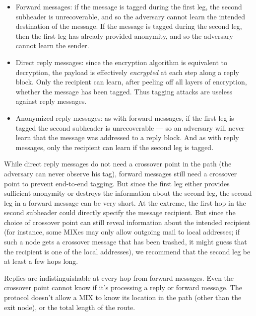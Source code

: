 \documentclass{llncs}
\begin{document}
\begin{itemize}
\item Forward messages: if the message is tagged during the first leg,
the second subheader is unrecoverable, and so the adversary cannot
learn the intended destination of the message. If the message is tagged
during the second leg, then the first leg has already provided anonymity,
and so the adversary cannot learn the sender.
\item Direct reply messages: since the encryption algorithm is equivalent to
decryption, the payload is effectively \emph{encrypted} at each step
along a reply block. Only the recipient can learn, after peeling off
all layers of encryption, whether the message has been tagged. Thus
tagging attacks are useless against reply messages.
\item Anonymized reply messages: as with forward messages, if the first leg
is tagged the second subheader is unrecoverable --- so an adversary will
never learn that the message was addressed to a reply block. And as with
reply messages, only the recipient can learn if the second leg is tagged.
\end{itemize}

While direct reply messages do not need a crossover point in the path
(the adversary can never observe his tag), forward messages still need a
crossover point to prevent end-to-end tagging. But since the first leg
either provides sufficient anonymity or destroys the information about
the second leg, the second leg in a forward message can be very short.
At the extreme, the first hop in the second subheader could directly
specify the message recipient. But since the choice of crossover point
can still reveal information about the intended recipient (for instance,
some MIXes may only allow outgoing mail to local addresses; if such a
node gets a crossover message that has been trashed, it might guess
that the recipient is one of the local addresses), we recommend that
the second leg be at least a few hops long.

Replies are indistinguishable at every hop from forward messages. Even the
crossover point cannot know if it's processing a reply or forward message.
The protocol doesn't allow a MIX to know its location in the path (other
than the exit node), or the total length of the route.
\end{document}
